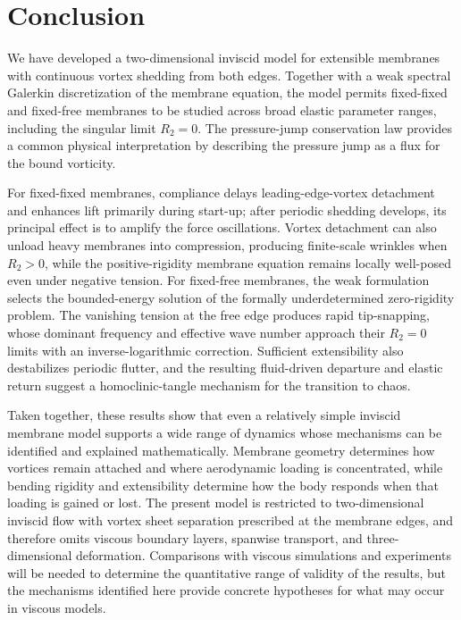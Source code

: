 \documentclass{article}[12pt]
\theoremstyle{Theorem}
\begin{document}
\section{Conclusion}
\label{conclusion section}

We have developed a two-dimensional inviscid model for extensible membranes with continuous vortex shedding from both edges. Together with a weak spectral Galerkin discretization of the membrane equation, the model permits fixed-fixed and fixed-free membranes to be studied across broad elastic parameter ranges, including the singular limit \(R_2=0\). The pressure-jump conservation law provides a common physical interpretation by describing the pressure jump as a flux for the bound vorticity.
\newline

For fixed-fixed membranes, compliance delays leading-edge-vortex detachment and enhances lift primarily during start-up; after periodic shedding develops, its principal effect is to amplify the force oscillations. Vortex detachment can also unload heavy membranes into compression, producing finite-scale wrinkles when \(R_2>0\), while the positive-rigidity membrane equation remains locally well-posed even under negative tension. For fixed-free membranes, the weak formulation selects the bounded-energy solution of the formally underdetermined zero-rigidity problem. The vanishing tension at the free edge produces rapid tip-snapping, whose dominant frequency and effective wave number approach their \(R_2=0\) limits with an inverse-logarithmic correction. Sufficient extensibility also destabilizes periodic flutter, and the resulting fluid-driven departure and elastic return suggest a homoclinic-tangle mechanism for the transition to chaos.
\newline

Taken together, these results show that even a relatively simple inviscid membrane model supports a wide range of dynamics whose mechanisms can be identified and explained mathematically. Membrane geometry determines how vortices remain attached and where aerodynamic loading is concentrated, while bending rigidity and extensibility determine how the body responds when that loading is gained or lost. The present model is restricted to two-dimensional inviscid flow with vortex sheet separation prescribed at the membrane edges, and therefore omits viscous boundary layers, spanwise transport, and three-dimensional deformation. Comparisons with viscous simulations and experiments will be needed to determine the quantitative range of validity of the results, but the mechanisms identified here provide concrete hypotheses for what may occur in viscous models.
\newline
\end{document}
